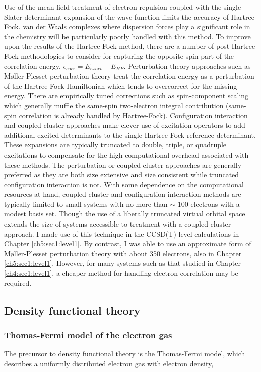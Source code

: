 \begin{theory}
  Use of the mean field treatment of electron repulsion coupled with the single Slater determinant expansion
  of the wave function limits the accuracy of Hartree-Fock. van der Waals complexes where dispersion forces 
  play a significant role in the chemistry will be particularly poorly handled with this method. To improve
  upon the results of the Hartree-Fock method, there are a number of post-Hartree-Fock methodologies to consider
  for capturing the opposite-spin part of the correlation energy, $\epsilon_{corr} = E_{exact} - E_{HF}$. 
  Perturbation theory approaches such as M$\text{\o}$ller-Plesset perturbation theory treat the correlation energy as
  a perturbation of the Hartree-Fock Hamiltonian which tends to overcorrect for the missing energy. There are
  empirically tuned corrections such as spin-component scaling which generally muffle the same-spin two-electron
  integral contribution (same-spin correlation is already handled by Hartree-Fock). Configuration interaction
  and coupled cluster approaches make clever use of excitation operators to add additional excited determinants
  to the single Hartree-Fock reference determinant. These expansions are typically truncated to double, triple,
  or quadruple excitations to compensate for the high computational overhead associated with these methods.
  The perturbation or coupled cluster approaches are generally preferred as they are both size extensive and
  size consistent while truncated configuration interaction is not. With some dependence on the computational 
  resources at hand, coupled cluster and configuration interaction methods are typically limited to small 
  systems with no more than $\sim$ 100 electrons with a modest basis set. Though the use of a liberally 
  truncated virtual orbital space extends the size of systems accessible to treatment with a coupled cluster 
  approach. I made use of this technique in the CCSD(T)-level calculations in Chapter \ref{ch5:sec1:level1}. 
  By contrast, I was able to use an approximate form of M$\text{\o}$ller-Plesset perturbation theory with about 350
  electrons, also in Chapter \ref{ch5:sec1:level1}. However, for many systems such as that studied in Chapter
  \ref{ch4:sec1:level1}, a cheaper method for handling electron correlation may be required.
  
  \subsection{\label{ch2:sec1:level4}Density functional theory}
   \subsubsection{\label{ch2:sec1:level4:chasm1}Thomas-Fermi model of the electron gas}
   The precursor to density functional theory is the Thomas-Fermi model, which describes a uniformly distributed
   electron gas with electron density,
   

\end{theory}
